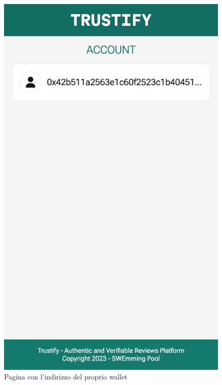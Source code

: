 \begin{figure}[H]
      \includegraphics[width=\linewidth]{src/img/account.png}
      \caption{Pagina con l'indirizzo del proprio wallet}\label{fig:account}
    \endminipage
\end{figure}


